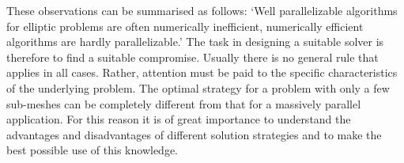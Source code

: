 These observations can be summarised as follows:
`Well parallelizable algorithms for elliptic problems are often numerically inefficient, numerically efficient algorithms are hardly parallelizable.' The task in designing a suitable solver is therefore to find a suitable compromise. Usually there is no general rule that applies in all cases. Rather, attention must be paid to the specific characteristics of the underlying problem. The optimal strategy for a problem with only a few sub-meshes can be completely different from that for a massively parallel application. For this reason it is of great importance to understand the advantages and disadvantages of different solution strategies and to make the best possible use of this knowledge.


